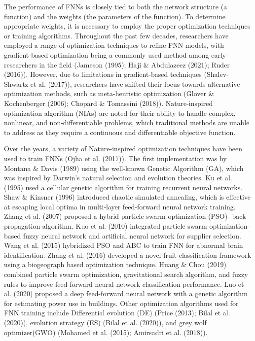 The performance of FNNs is closely tied to both the network structure (a function) and the weights (the parameters of the function). To determine appropriate weights, it is necessary to employ the proper optimization techniques or training algorithms. Throughout the past few decades, researchers have employed a range of optimization techniques to refine FNN models, with gradient-based optimization being a commonly used method among early researchers in the field (Jameson (1995); Haji \& Abdulazeez (2021); Ruder (2016)). However, due to limitations in gradient-based techniques (Shalev-Shwartz et al. (2017)), researchers have shifted their focus towards alternative optimization methods, such as meta-heuristic optimization (Glover \& Kochenberger (2006); Chopard \& Tomassini (2018)). Nature-inspired optimization algorithm (NIAs) are noted for their ability to handle complex, nonlinear, and non-differentiable problems, which traditional methods are unable to address as they require a continuous and differentiable objective function.

Over the years, a variety of Nature-inspired optimization techniques have been used to train FNNs (Ojha et al. (2017)). The first implementation was by Montana \& Davis (1989) using the well-known Genetic Algorithm (GA), which was inspired by Darwin’s natural selection and evolution theories. Ku et al. (1995) used a cellular genetic algorithm for training recurrent neural networks. Shaw \& Kinsner (1996) introduced chaotic simulated annealing, which is effective at escaping local optima in multi-layer feed-forward neural network training. Zhang et al. (2007) proposed a hybrid particle swarm optimization (PSO)- back propagation algorithm. Kuo et al. (2010) integrated particle swarm optimization-based fuzzy neural network and artificial neural network for supplier selection. Wang et al. (2015) hybridized PSO and ABC to train FNN for abnormal brain identification. Zhang et al. (2016) developed a novel fruit classification framework using a biogeograph based optimization technique. Huang \& Chou (2019) combined particle swarm optimization, gravitational search algorithm, and fuzzy rules to improve feed-forward neural network classification performance. Luo et al. (2020) proposed a deep feed-forward neural network with a genetic algorithm for estimating power use in buildings. Other optimization algorithms used for FNN training include Differential evolution (DE) (Price (2013); Bilal et al. (2020)), evolution strategy (ES) (Bilal et al. (2020)), and grey wolf optimizer(GWO) (Mohamed et al. (2015); Amirsadri et al. (2018)).

